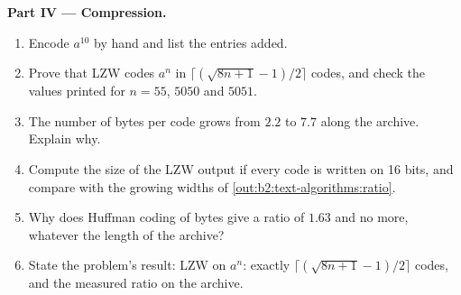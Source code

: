 \begin{problem}
\medskip\noindent\textbf{Part IV --- Compression.}\par\nopagebreak
\begin{enumerate}[resume, beginpenalty=10000]
\item Encode $a^{10}$ by hand and list the entries added.
\item Prove that LZW codes $a^n$ in $\lceil (\sqrt{8n+1}-1)/2 \rceil$ codes, and check the values printed for $n = 55$,
$5050$ and $5051$.
\item The number of bytes per code grows from $2.2$ to $7.7$ along the archive. Explain why.
\item Compute the size of the LZW output if every code is written on 16 bits, and compare with the
growing widths of \cref{out:b2:text-algorithms:ratio}.
\item Why does Huffman coding of bytes give a ratio of $1.63$ and no more, whatever the length of the archive?
\item State the problem's result: LZW on $a^n$: exactly $\lceil (\sqrt{8n+1} - 1)/2 \rceil$ codes, and the measured ratio
on the archive.
\end{enumerate}
\end{problem}
